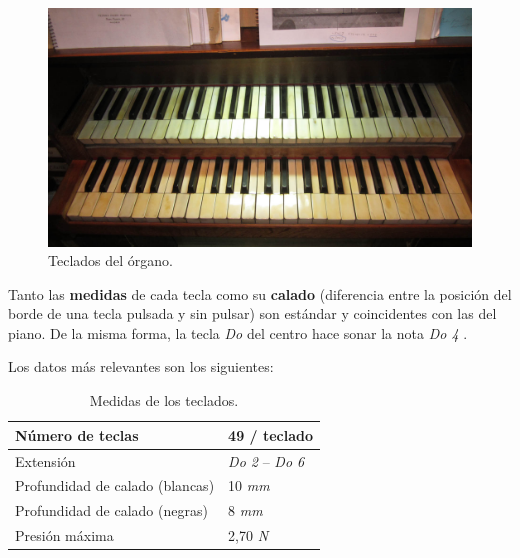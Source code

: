 \smallskip

\begin{figure}[H]
	\noindent \begin{centering}
		\includegraphics[width=\linewidth*3/4]{capitulo3/teclados}
		\par\end{centering}
	\smallskip
	\caption{\label{fig:teclados} Teclados del órgano.}
\end{figure} 

\smallskip

Tanto las \textbf{medidas} de cada tecla como su \textbf{calado} (diferencia entre la posición del borde de una tecla pulsada y sin pulsar) son estándar y coincidentes con las del piano. De la misma forma, la tecla \textit{Do} del centro hace sonar la nota \textit{Do 4} \footnotemark.


Los datos más relevantes son los siguientes:

\smallskip

\begin{table}[H]
	\begin{center}
		\begin{tabular}{|l|l|}
			\hline Número de teclas & 49 / teclado \\
			\hline Extensión & \textit{Do 2} -- \textit{Do 6} \\
			\hline Profundidad de calado (blancas) & 10 \textit{mm} \\
			\hline Profundidad de calado (negras) & 8 \textit{mm} \\
			\hline Presión máxima & 2,70 \textit{N} \\
			\hline
		\end{tabular}
		\smallskip
		\caption{\label{tab:teclados} Medidas de los teclados.}
	\end{center}
\end{table}


